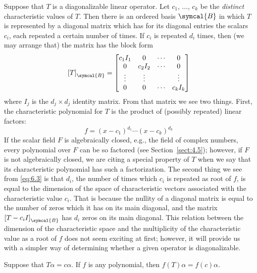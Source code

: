Suppose that \(T\) is a diagonalizable linear operator. Let \(c_1\), \(\ldots\), \(c_k\) be the \emph{distinct} characteristic values of \(T\). Then there is an ordered basis \(\symcal{B}\) in which \(T\) is represented by a diagonal matrix which has for its diagonal entries the scalars \(c_i\), each repeated a certain number of times. If \(c_i\) is repeated \(d_i\) times, then (we may arrange that) the matrix has the block form
\begin{equation}
    \left[T\right]_{\symcal{B}}=
    \begin{bmatrix}
        c_1I_1 & 0 & \cdots & 0 \\
        0 & c_2I_2 & \cdots & 0 \\
        \vdots & \vdots && \vdots \\
        0 & 0 & \cdots & c_kI_k
    \end{bmatrix}
    \label{eq:6.3}
\end{equation}
where \(I_j\) is the \(d_j\times d_j\) identity matrix. From that matrix we see two things. First, the characteristic polynomial for \(T\) is the product of (possibly repeated) linear factors:
\begin{equation*}
    f=\left(x-c_1\right)^{d_1}\cdots\left(x-c_k\right)^{d_k}
\end{equation*}
If the scalar field \(F\) is algebraically closed, e.g., the field of complex numbers, every polynomial over \(F\) can be so factored (see Section~\ref{sect:4.5}); however, if \(F\) is not algebraically closed, we are citing a special property of \(T\) when we say that its characteristic polynomial has such a factorization. The second thing we see from \eqref{eq:6.3} is that \(d_i\), the number of times which \(c_i\) is repeated as root of \(f\), is equal to the dimension of the space of characteristic vectors associated with the characteristic value \(c_i\). That is because the nullity of a diagonal matrix is equal to the number of zeros which it has on its main diagonal, and the matrix \(\left[T-c_iI\right]_{\symcal{B}}\) has \(d_i\) zeros on its main diagonal. This relation between the dimension of the characteristic space and the multiplicity of the characteristic value as a root of \(f\) does not seem exciting at first; however, it will provide us with a simpler way of determining whether a given operator is diagonalizable.

\begin{lemma}
    Suppose that \(T\alpha=c\alpha\). If \(f\) is any polynomial, then \(f\left(T\right)\alpha=f\left(c\right)\alpha\).
\end{lemma}

